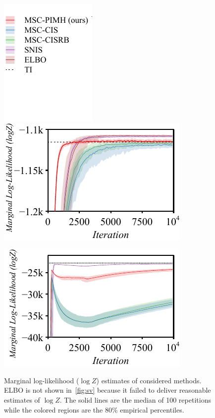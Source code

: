 %
\begin{figure}
  \centering
  \begin{minipage}[b]{0.17\linewidth}
    \centering
    \includegraphics[scale=0.8]{figures/radon_03.pdf}
  \end{minipage}
  \begin{minipage}[b]{0.35\linewidth}
    \centering
    \includegraphics[scale=0.7]{figures/radon_02.pdf}
  \end{minipage}
  \begin{minipage}[b]{0.35\linewidth}
    \centering
    \includegraphics[scale=0.7]{figures/sv_02.pdf}\label{fig:sv}
  \end{minipage}
  \caption{Marginal log-likelihood (\(\log Z\)) estimates of considered methods.
    ELBO is not shown in~\cref{fig:sv} because it failed to deliver reasonable estimates of \(\log Z\).
    The solid lines are the median of 100 repetitions while the colored regions are the 80\% empirical percentiles.
  }\label{fig:marginal_likelihood}
\end{figure}
%
